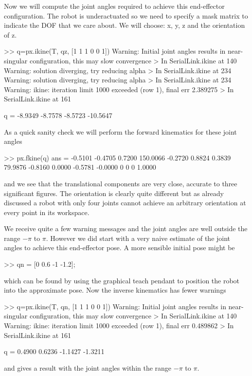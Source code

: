 \documentclass[11pt]{article}
\begin{document}
Now we will compute the joint angles required to achieve this end-effector configuration.  The robot is underactuated
so we need to specify a mask matrix to indicate the DOF that we care about.  We will choose: x, y, z and the orientation of
z.
\begin{Code}
>> q=px.ikine(T, qz, [1 1 1  0 0 1])
Warning: Initial joint angles results in near-singular configuration, this may slow convergence 
> In SerialLink.ikine at 140 
Warning: solution diverging, try reducing alpha 
> In SerialLink.ikine at 234 
Warning: solution diverging, try reducing alpha 
> In SerialLink.ikine at 234 
Warning: ikine: iteration limit 1000 exceeded (row 1), final err 2.389275 
> In SerialLink.ikine at 161 

q =
   -8.9349   -8.7578   -8.5723  -10.5647
\end{Code}
As a quick sanity check we will perform the forward kinematics for these joint angles
\begin{Code}
>> px.fkine(q)
ans =
   -0.5101   -0.4705    0.7200  150.0066
   -0.2720    0.8824    0.3839   79.9876
   -0.8160    0.0000   -0.5781   -0.0000
         0         0         0    1.0000
\end{Code}
and we see that the translational components are very close, accurate to three significant figures.     The orientation
is clearly quite different but as already discussed a robot with only four joints cannot achieve an arbitrary orientation
at every point in its workspace.
      
We receive quite a few warning messages and the joint angles are well outside the range $-\pi$ to $\pi$.  However
we did start with a very naive estimate of the joint angles to achieve this end-effector pose.
A more sensible initial pose might be
\begin{Code}
>> qn = [0 0.6 -1 -1.2];
\end{Code}
which can be found by using the graphical teach pendant to position the robot into the approximate pose.
Now the inverse kinematics  has fewer warnings
\begin{Code}
>> q=px.ikine(T, qn, [1 1 1  0 0 1])
Warning: Initial joint angles results in near-singular configuration, this may slow convergence 
> In SerialLink.ikine at 140 
Warning: ikine: iteration limit 1000 exceeded (row 1), final err 0.489862 
> In SerialLink.ikine at 161 

q =
    0.4900    0.6236   -1.1427   -1.3211
\end{Code}
and gives a result with the joint angles within the range $-\pi$ to $\pi$.
\end{document}
